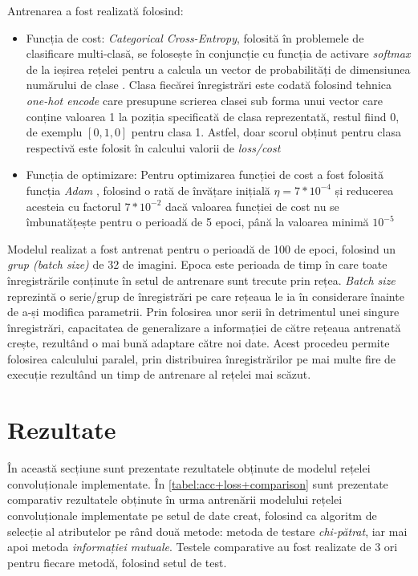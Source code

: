 Antrenarea a fost realizată folosind:
\begin{itemize}
\item Funcția de cost: \textit{Categorical Cross-Entropy}, folosită în problemele de clasificare multi-clasă, se folosește în conjuncție cu funcția de activare \textit{softmax} de la ieșirea rețelei pentru a calcula un vector de probabilități de dimensiunea numărului de clase \cite{online:CCE-loss}. Clasa fiecărei înregistrări este codată folosind tehnica \textit{one-hot encode} care presupune scrierea clasei sub forma unui vector care conține valoarea 1 la poziția specificată de clasa reprezentată, restul fiind 0, de exemplu $[0,1,0]$ pentru clasa 1. Astfel, doar scorul obținut pentru clasa respectivă este folosit în calcului valorii de \textit{loss/cost}
\item Funcția de optimizare: Pentru optimizarea funcției de cost a fost folosită funcția \textit{Adam} \cite{kingma2014adam}, folosind o rată de învățare inițială $\eta=7*10^{-4}$ și reducerea acesteia cu factorul $7*10^{-2}$ dacă valoarea funcției de cost nu se îmbunatățește pentru o perioadă de 5 epoci, până la valoarea minimă $10^{-5}$
\end{itemize}

Modelul realizat a fost antrenat pentru o perioadă de 100 de epoci, folosind un \textit{grup (batch size)} de 32 de imagini. Epoca este perioada de timp în care toate înregistrările conținute în setul de antrenare sunt trecute prin rețea. \textit{Batch size} reprezintă o serie/grup de înregistrări pe care rețeaua le ia în considerare înainte de a-și modifica parametrii. Prin folosirea unor serii în detrimentul unei singure înregistrări, capacitatea de generalizare a informației de către rețeaua antrenată crește, rezultând o mai bună adaptare către noi date. Acest procedeu permite folosirea calculului paralel, prin distribuirea înregistrărilor pe mai multe fire de execuție rezultând un timp de antrenare al rețelei mai scăzut. 

\section{Rezultate}
În această secțiune sunt prezentate rezultatele obținute de modelul rețelei convoluționale implementate. În \autoref{tabel:acc+loss+comparison} sunt prezentate comparativ rezultatele obținute în urma antrenării modelului rețelei convoluționale implementate pe setul de date creat, folosind ca algoritm de selecție al atributelor pe rând două metode: metoda de testare \textit{chi-pătrat}, iar mai apoi metoda \textit{informației mutuale}. Testele comparative au fost realizate de 3 ori pentru fiecare metodă, folosind setul de test.

